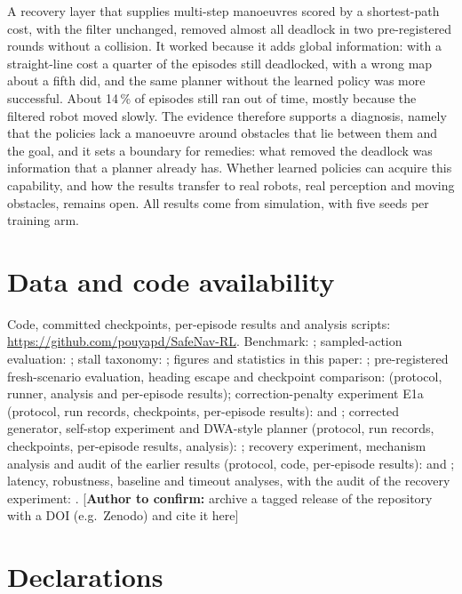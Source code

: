 \documentclass[11pt]{article}
\newcommand{\authorcheck}[1]{\textcolor{blue!70!black}{[\textbf{Author to confirm:} #1]}}
\theoremstyle{definition}
\theoremstyle{remark}
\begin{document}
A recovery layer that supplies multi-step manoeuvres scored by a shortest-path cost, with the filter unchanged, removed almost all deadlock in two pre-registered rounds without a collision. It worked because it adds global information: with a straight-line cost a quarter of the episodes still deadlocked, with a wrong map about a fifth did, and the same planner without the learned policy was more successful. About 14\,\% of episodes still ran out of time, mostly because the filtered robot moved slowly. The evidence therefore supports a diagnosis, namely that the policies lack a manoeuvre around obstacles that lie between them and the goal, and it sets a boundary for remedies: what removed the deadlock was information that a planner already has. Whether learned policies can acquire this capability, and how the results transfer to real robots, real perception and moving obstacles, remains open. All results come from simulation, with five seeds per training arm.

\section*{Data and code availability}\label{sec:avail}
Code, committed checkpoints, per-episode results and analysis scripts: \url{https://github.com/pouyapd/SafeNav-RL}. Benchmark: ; sampled-action evaluation: ; stall taxonomy: ; figures and statistics in this paper: ; pre-registered fresh-scenario evaluation, heading escape and checkpoint comparison:  (protocol, runner, analysis and per-episode results); correction-penalty experiment E1a (protocol, run records, checkpoints, per-episode results):  and ; corrected generator, self-stop experiment and DWA-style planner (protocol, run records, checkpoints, per-episode results, analysis): ; recovery experiment, mechanism analysis and audit of the earlier results (protocol, code, per-episode results):  and ; latency, robustness, baseline and timeout analyses, with the audit of the recovery experiment: . \authorcheck{archive a tagged release of the repository with a DOI (e.g.\ Zenodo) and cite it here}

\section*{Declarations}
\end{document}

